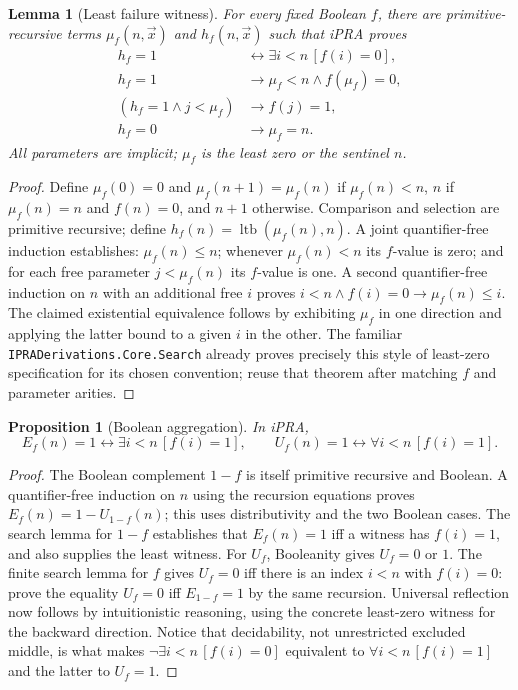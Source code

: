 \documentclass[11pt]{article}
\newtheorem{lemma}[theorem]{Lemma}
\newtheorem{proposition}[theorem]{Proposition}
\begin{document}
\begin{lemma}[Least failure witness]\label{lem:search}
For every fixed Boolean $f$, there are primitive-recursive terms $\mu_f(n,\vec x)$ and $h_f(n,\vec x)$ such that iPRA proves
\begin{align*}
h_f=1&\leftrightarrow \exists i<n\,[f(i)=0],\\
h_f=1&\to\mu_f<n\land f(\mu_f)=0,\\
(h_f=1\land j<\mu_f)&\to f(j)=1,\\
h_f=0&\to \mu_f=n.
\end{align*}
All parameters are implicit; $\mu_f$ is the least zero or the sentinel $n$.
\end{lemma}
\begin{proof}
Define $\mu_f(0)=0$ and $\mu_f(n+1)=\mu_f(n)$ if $\mu_f(n)<n$, $n$ if $\mu_f(n)=n$ and $f(n)=0$, and $n+1$ otherwise. Comparison and selection are primitive recursive; define $h_f(n)=\operatorname{ltb}(\mu_f(n),n)$. A joint quantifier-free induction establishes: $\mu_f(n)\le n$; whenever $\mu_f(n)<n$ its $f$-value is zero; and for each free parameter $j<\mu_f(n)$ its $f$-value is one. A second quantifier-free induction on $n$ with an additional free $i$ proves $i<n\land f(i)=0\to\mu_f(n)\le i$. The claimed existential equivalence follows by exhibiting $\mu_f$ in one direction and applying the latter bound to a given $i$ in the other. The familiar \texttt{IPRADerivations.Core.Search} already proves precisely this style of least-zero specification for its chosen convention; reuse that theorem after matching $f$ and parameter arities.
\end{proof}

\begin{proposition}[Boolean aggregation]\label{prop:agg}
In iPRA,
\[E_f(n)=1\leftrightarrow \exists i<n\,[f(i)=1],\qquad U_f(n)=1\leftrightarrow \forall i<n\,[f(i)=1].\]
\end{proposition}
\begin{proof}
The Boolean complement $1-f$ is itself primitive recursive and Boolean. A quantifier-free induction on $n$ using the recursion equations proves $E_f(n)=1-U_{1-f}(n)$; this uses distributivity and the two Boolean cases. The search lemma for $1-f$ establishes that $E_f(n)=1$ iff a witness has $f(i)=1$, and also supplies the least witness. For $U_f$, Booleanity gives $U_f=0$ or $1$. The finite search lemma for $f$ gives $U_f=0$ iff there is an index $i<n$ with $f(i)=0$: prove the equality $U_f=0$ iff $E_{1-f}=1$ by the same recursion. Universal reflection now follows by intuitionistic reasoning, using the concrete least-zero witness for the backward direction. Notice that decidability, not unrestricted excluded middle, is what makes $\neg\exists i<n\, [f(i)=0]$ equivalent to $\forall i<n\,[f(i)=1]$ and the latter to $U_f=1$.
\end{proof}
\end{document}
